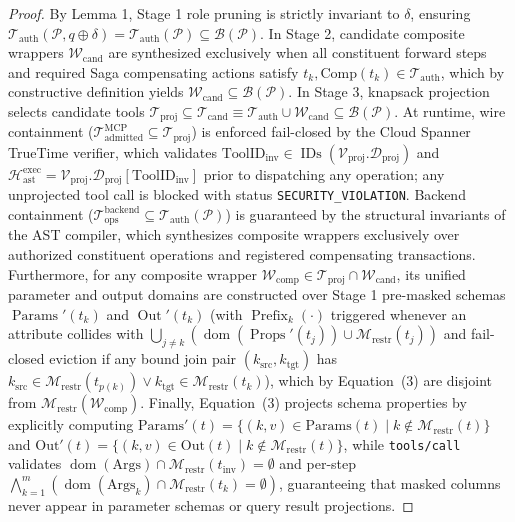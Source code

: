 \documentclass[conference,10pt]{IEEEtran}
\begin{document}
\begin{proof}
By Lemma 1, Stage 1 role pruning is strictly invariant to $\delta$, ensuring $\mathcal{T}_{\text{auth}}(\mathcal{P}, q \oplus \delta) = \mathcal{T}_{\text{auth}}(\mathcal{P}) \subseteq \mathcal{B}(\mathcal{P})$. In Stage 2, candidate composite wrappers $\mathcal{W}_{\text{cand}}$ are synthesized exclusively when all constituent forward steps and required Saga compensating actions satisfy $t_k, \text{Comp}(t_k) \in \mathcal{T}_{\text{auth}}$, which by constructive definition yields $\mathcal{W}_{\text{cand}} \subseteq \mathcal{B}(\mathcal{P})$. In Stage 3, knapsack projection selects candidate tools $\mathcal{T}_{\text{proj}} \subseteq \mathcal{T}_{\text{cand}} \equiv \mathcal{T}_{\text{auth}} \cup \mathcal{W}_{\text{cand}} \subseteq \mathcal{B}(\mathcal{P})$. At runtime, wire containment ($\mathcal{T}_{\text{admitted}}^{\text{MCP}} \subseteq \mathcal{T}_{\text{proj}}$) is enforced fail-closed by the Cloud Spanner TrueTime verifier, which validates $\text{ToolID}_{\text{inv}} \in \operatorname{IDs}(\mathcal{V}_{\text{proj}}.\mathcal{D}_{\text{proj}})$ and $\mathcal{H}_{\text{ast}}^{\text{exec}} = \mathcal{V}_{\text{proj}}.\mathcal{D}_{\text{proj}}[\text{ToolID}_{\text{inv}}]$ prior to dispatching any operation; any unprojected tool call is blocked with status \texttt{SECURITY\_VIOLATION}. Backend containment ($\mathcal{T}_{\text{ops}}^{\text{backend}} \subseteq \mathcal{T}_{\text{auth}}(\mathcal{P})$) is guaranteed by the structural invariants of the AST compiler, which synthesizes composite wrappers exclusively over authorized constituent operations and registered compensating transactions. Furthermore, for any composite wrapper $\mathcal{W}_{\text{comp}} \in \mathcal{T}_{\text{proj}} \cap \mathcal{W}_{\text{cand}}$, its unified parameter and output domains are constructed over Stage 1 pre-masked schemas $\operatorname{Params}'(t_k)$ and $\operatorname{Out}'(t_k)$ (with $\operatorname{Prefix}_k(\cdot)$ triggered whenever an attribute collides with $\bigcup_{j \neq k} (\operatorname{dom}(\operatorname{Props}'(t_j)) \cup \mathcal{M}_{\text{restr}}(t_j))$ and fail-closed eviction if any bound join pair $(k_{\text{src}}, k_{\text{tgt}})$ has $k_{\text{src}} \in \mathcal{M}_{\text{restr}}(t_{p(k)}) \lor k_{\text{tgt}} \in \mathcal{M}_{\text{restr}}(t_k)$), which by Equation~(3) are disjoint from $\mathcal{M}_{\text{restr}}(\mathcal{W}_{\text{comp}})$. Finally, Equation~(3) projects schema properties by explicitly computing $\text{Params}'(t) = \{(k, v) \in \text{Params}(t) \mid k \notin \mathcal{M}_{\text{restr}}(t)\}$ and $\text{Out}'(t) = \{(k, v) \in \text{Out}(t) \mid k \notin \mathcal{M}_{\text{restr}}(t)\}$, while \texttt{tools/call} validates $\operatorname{dom}(\text{Args}) \cap \mathcal{M}_{\text{restr}}(t_{\text{inv}}) = \emptyset$ and per-step $\bigwedge_{k=1}^m (\operatorname{dom}(\text{Args}_k) \cap \mathcal{M}_{\text{restr}}(t_k) = \emptyset)$, guaranteeing that masked columns never appear in parameter schemas or query result projections.
\end{proof}
\end{document}
